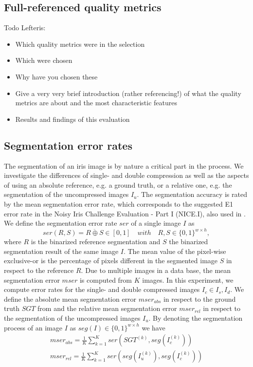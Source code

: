 \documentclass[10pt,twocolumn,letterpaper]{article}
\begin{document}
\subsection{Full-referenced quality metrics}
Todo Lefteris:
\begin{itemize}
 \item Which quality metrics were in the selection
 \item Which were chosen
 \item Why have you chosen these
 \item Give a very very brief introduction (rather referencing!) of what the quality metrics are about and the most characteristic features
 \item Results and findings of this evaluation
\end{itemize}

\subsection{Segmentation error rates}
The segmentation of an iris image is by nature a critical part in the process. We investigate the differences of single- and double compression as well as the aspects of using an absolute reference, e.g. a ground truth, or a relative one, e.g. the segmentation of the uncompressed images $I_u$.
The segmentation accuracy is rated by the mean segmentation error rate, which corresponds to the suggested E1 error rate in the Noisy Iris Challenge Evaluation - Part I (NICE.I), also used in \cite{severeCompression}. We define the segmentation error rate $ser$ of a single image $I$ as
\begin{equation}
ser(R,S) = \overline{R \oplus S} \in [0,1]\quad with \quad R,S \in \{0,1\}^{w \times h},
\end{equation} where $R$ is the binarized reference segmentation and $S$ the binarized segmentation result of the same image $I$. The mean value of the pixel-wise exclusive-or is the percentage of pixels different in the segmented image $S$ in respect to the reference $R$. Due to multiple images in a data base, the mean segmentation error $mser$ is computed from $K$ images. In this experiment, we compute error rates for the single- and double compressed images $I_c \in {I_s, I_d}$. We define the absolute mean segmentation error $mser_{abs}$ in respect to the ground truth $SGT$ from \cite{severeCompression} and the relative mean segmentation error $mser_{rel}$ in respect to the segmentation of the uncompressed images $I_u$. By denoting the segmentation process of an image $I$ as $seg(I) \in \{0,1\}^{w \times h}$ we have
\begin{eqnarray}
mser_{abs} = \frac{1}{K}\sum_{k=1}^{K}ser(SGT^{(k)},seg(I_c^{(k)})) \\
mser_{rel} = \frac{1}{K}\sum_{k=1}^{K}ser(seg(I_u^{(k)}),seg(I_c^{(k)}))
\end{eqnarray}
\end{document}
